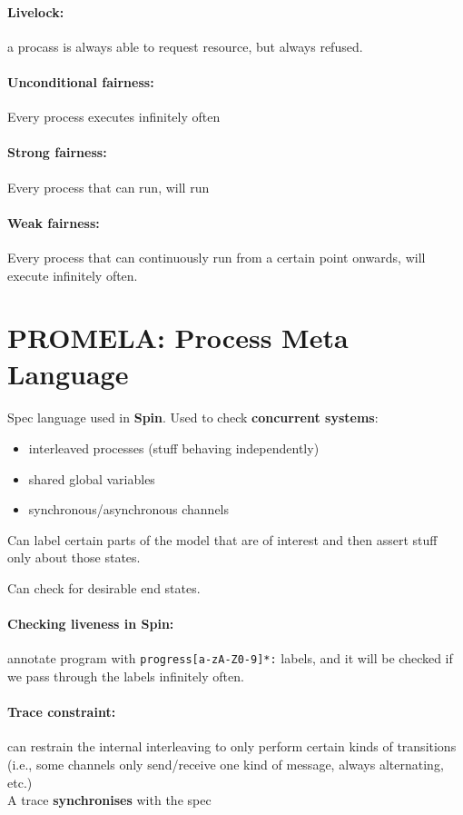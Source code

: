 \documentclass{article}
\begin{document}
\paragraph{Livelock:} a procass is always able to request resource, but always refused.
\paragraph{Unconditional fairness:} Every process executes infinitely often
\paragraph{Strong fairness:} Every process that can run, will run
\paragraph{Weak fairness:} Every process that can continuously run from a
certain point onwards, will execute infinitely often.

\section{PROMELA: Process Meta Language}
\paragraph{}
Spec language used in \textbf{Spin}.
Used to check \textbf{concurrent systems}:
\begin{itemize}
\item interleaved processes (stuff behaving independently)
\item shared global variables
\item synchronous/asynchronous channels
\end{itemize}

Can label certain parts of the model that are of interest and then assert stuff
only about those states.

Can check for desirable end states.

\paragraph{Checking liveness in Spin:} annotate program with
\texttt{progress[a-zA-Z0-9]*:} labels, and it will be checked if we pass through
the labels infinitely often.

\paragraph{Trace constraint:} can restrain the internal interleaving to only
perform certain kinds of transitions (i.e., some channels only send/receive one
kind of message, always alternating, etc.)
\\
A trace \textbf{synchronises} with the spec
\end{document}
